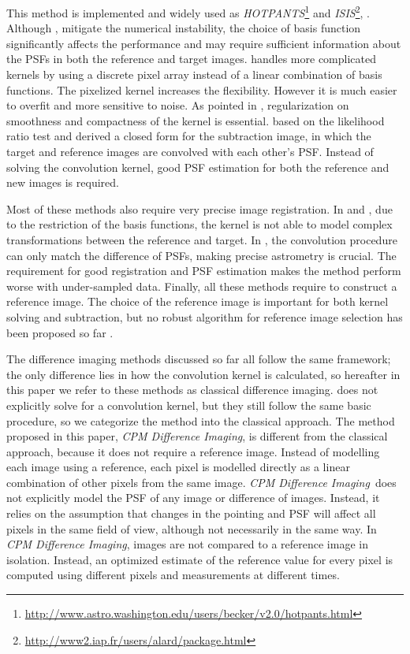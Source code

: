\documentclass[12pt, preprint]{aastex}
\newcommand{\project}[1]{\textsl{#1}}
\newcommand{\cpmdiff}{\project{CPM Difference Imaging}}
\begin{document}
This method is implemented and widely used as \project{HOTPANTS}\footnote{\url{http://www.astro.washington.edu/users/becker/v2.0/hotpants.html}} and \project{ISIS}\footnote{\url{http://www2.iap.fr/users/alard/package.html}}, \cite{varyingkernel}. 
Although \cite{alard}, \cite{varyingkernel} mitigate the numerical instability, the choice of basis function significantly affects the performance and may require sufficient information about the PSFs in both the reference and target images.
\cite{bramich} handles more complicated kernels by using a discrete pixel array instead of a linear combination of basis functions.
The pixelized kernel increases the flexibility. 
However it is much easier to overfit and more sensitive to noise. 
As pointed in \cite{regularization}, regularization on smoothness and compactness of the kernel is essential.  
\cite{optimal} based on the likelihood ratio test and derived a closed form for the subtraction image, in which the target and reference images are convolved with each other's PSF.
Instead of solving the convolution kernel, good PSF estimation for both the reference and new images is required.

Most of these methods also require very precise image registration. 
In \cite{alard} and \cite{varyingkernel}, due to the restriction of the basis functions, the kernel is not able to model complex transformations between the reference and target. 
In \cite{optimal}, the convolution procedure can only match the difference of PSFs, making precise astrometry is crucial.
The requirement for good registration and PSF estimation makes the method perform worse with under-sampled data.
Finally, all these methods require to construct a reference image. 
The choice of the reference image is important for both kernel solving and subtraction, but no robust algorithm for reference image selection has been proposed so far \citep{reference}.

The difference imaging methods discussed so far \citep{imagesub1, alard, varyingkernel, bramich} all follow the same framework; the only difference lies in how the convolution kernel is calculated, so hereafter in this paper we refer to these methods as classical difference imaging. 
\cite{optimal} does not explicitly solve for a convolution kernel, but they still follow the same basic procedure, so we categorize the method into the classical approach.
The method proposed in this paper, \cpmdiff, is different from the classical approach, because it does not require a reference image. 
Instead of modelling each image using a reference, each pixel is modelled directly as a linear combination of other pixels from the same image. 
\cpmdiff\ does not explicitly model the PSF of any image
or difference of images. 
Instead, it relies on the assumption that changes in the pointing and PSF will affect all pixels in the same field of view, although not necessarily in the same way. 
In \cpmdiff, images are not compared to a reference image in isolation. 
Instead, an optimized estimate of the reference value for every pixel is computed using different pixels and measurements at different times.
\end{document}

